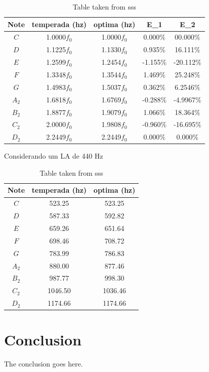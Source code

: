 \documentclass[journal]{IEEEtran}
\begin{document}
\begin{table}[h]
\center
\begin{tabular}{c|c|c|c|c}
Note & temperada (hz)& optima (hz) & E_1 & E_2 \\ \hline
\hline 
$C$  & 1.0000$f_0$ & 1.0000$f_0$ & 0.000\% & 00.000\% \\
$D$  & 1.1225$f_0$ & 1.1330$f_0$ & 0.935\% & 16.111\% \\
$E$  & 1.2599$f_0$ & 1.2454$f_0$ &-1.155\% &-20.112\% \\
$F$  & 1.3348$f_0$ & 1.3544$f_0$ & 1.469\% & 25.248\% \\
$G$  & 1.4983$f_0$ & 1.5037$f_0$ & 0.362\% & 6.2546\% \\
$A_2$& 1.6818$f_0$ & 1.6769$f_0$ &-0.288\% &-4.9967\% \\
$B_2$& 1.8877$f_0$ & 1.9079$f_0$ & 1.066\% & 18.364\% \\
$C_2$& 2.0000$f_0$ & 1.9808$f_0$ &-0.960\% &-16.695\% \\
$D_2$& 2.2449$f_0$ & 2.2449$f_0$ & 0.000\% & 0.000\% \\ \hline
\end{tabular}
\caption{Table taken from sss}
\label{table:res}
\end{table}

Considerando um LA de 440 Hz
\begin{table}[h]
\center
\begin{tabular}{c|c|c}
Note & temperada (hz) & optima (hz)\\ \hline
\hline                           
$C$  &  523.25 &  523.25 \\
$D$  &  587.33 &  592.82 \\
$E$  &  659.26 &  651.64 \\
$F$  &  698.46 &  708.72 \\
$G$  &  783.99 &  786.83 \\
$A_2$&  880.00 &  877.46 \\
$B_2$&  987.77 &  998.30 \\
$C_2$& 1046.50 & 1036.46 \\
$D_2$& 1174.66 & 1174.66 \\ \hline
\end{tabular}
\caption{Table taken from sss}
\label{table:example1}
\end{table}

\section{Conclusion}
The conclusion goes here.
\end{document}
